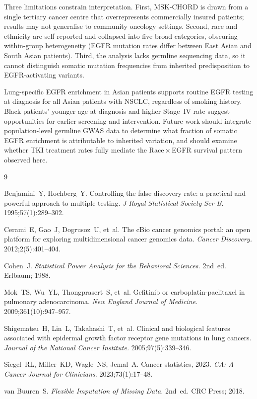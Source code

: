\documentclass[12pt]{article}
\begin{document}
Three limitations constrain interpretation.
First, MSK-CHORD is drawn from a single tertiary cancer centre that
overrepresents commercially insured patients; results may not generalise to
community oncology settings.
Second, race and ethnicity are self-reported and collapsed into five broad
categories, obscuring within-group heterogeneity (EGFR mutation rates differ
between East Asian and South Asian patients).
Third, the analysis lacks germline sequencing data, so it cannot distinguish
somatic mutation frequencies from inherited predisposition to EGFR-activating
variants.

Lung-specific EGFR enrichment in Asian patients supports routine EGFR testing
at diagnosis for all Asian patients with NSCLC, regardless of smoking history.
Black patients' younger age at diagnosis and higher Stage~IV rate suggest
opportunities for earlier screening and intervention.
Future work should integrate population-level germline GWAS data to determine
what fraction of somatic EGFR enrichment is attributable to inherited variation,
and should examine whether TKI treatment rates fully mediate the
Race\,$\times$\,EGFR survival pattern observed here.

\begin{thebibliography}{9}

Benjamini~Y, Hochberg~Y.
Controlling the false discovery rate: a practical and powerful approach to
multiple testing.
\textit{J Royal Statistical Society Ser B.} 1995;57(1):289--302.

Cerami~E, Gao~J, Dogrusoz~U, et~al.
The cBio cancer genomics portal: an open platform for exploring
multidimensional cancer genomics data.
\textit{Cancer Discovery.} 2012;2(5):401--404.

Cohen~J.
\textit{Statistical Power Analysis for the Behavioral Sciences.}
2nd~ed. Erlbaum; 1988.

Mok~TS, Wu~YL, Thongprasert~S, et~al.
Gefitinib or carboplatin-paclitaxel in pulmonary adenocarcinoma.
\textit{New England Journal of Medicine.} 2009;361(10):947--957.

Shigematsu~H, Lin~L, Takahashi~T, et~al.
Clinical and biological features associated with epidermal growth factor
receptor gene mutations in lung cancers.
\textit{Journal of the National Cancer Institute.} 2005;97(5):339--346.

Siegel~RL, Miller~KD, Wagle~NS, Jemal~A.
Cancer statistics, 2023.
\textit{CA: A Cancer Journal for Clinicians.} 2023;73(1):17--48.

van Buuren~S.
\textit{Flexible Imputation of Missing Data.}
2nd~ed. CRC Press; 2018.

\end{thebibliography}
\end{document}
